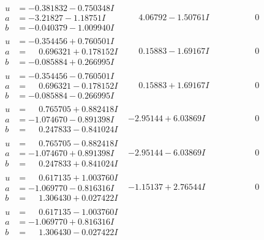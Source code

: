 \documentclass[1p]{elsarticle_modified}
\theoremstyle{definition}
\begin{document}
$$\begin{array}{c|c|c}
\begin{aligned}
u &= -0.381832 - 0.750348 I \\
a &= -3.21827 - 1.18751 I \\
b &= -0.040379 - 1.009940 I\end{aligned}
 & \phantom{-}4.06792 - 1.50761 I & \phantom{-0.000000 } 0 \\ \hline\begin{aligned}
u &= -0.354456 + 0.760501 I \\
a &= \phantom{-}0.696321 + 0.178152 I \\
b &= -0.085884 + 0.266995 I\end{aligned}
 & \phantom{-}0.15883 - 1.69167 I & \phantom{-0.000000 } 0 \\ \hline\begin{aligned}
u &= -0.354456 - 0.760501 I \\
a &= \phantom{-}0.696321 - 0.178152 I \\
b &= -0.085884 - 0.266995 I\end{aligned}
 & \phantom{-}0.15883 + 1.69167 I & \phantom{-0.000000 } 0 \\ \hline\begin{aligned}
u &= \phantom{-}0.765705 + 0.882418 I \\
a &= -1.074670 - 0.891398 I \\
b &= \phantom{-}0.247833 - 0.841024 I\end{aligned}
 & -2.95144 + 6.03869 I & \phantom{-0.000000 } 0 \\ \hline\begin{aligned}
u &= \phantom{-}0.765705 - 0.882418 I \\
a &= -1.074670 + 0.891398 I \\
b &= \phantom{-}0.247833 + 0.841024 I\end{aligned}
 & -2.95144 - 6.03869 I & \phantom{-0.000000 } 0 \\ \hline\begin{aligned}
u &= \phantom{-}0.617135 + 1.003760 I \\
a &= -1.069770 - 0.816316 I \\
b &= \phantom{-}1.306430 + 0.027422 I\end{aligned}
 & -1.15137 + 2.76544 I & \phantom{-0.000000 } 0 \\ \hline\begin{aligned}
u &= \phantom{-}0.617135 - 1.003760 I \\
a &= -1.069770 + 0.816316 I \\
b &= \phantom{-}1.306430 - 0.027422 I\end{aligned}

\end{array}$$
\end{document}
